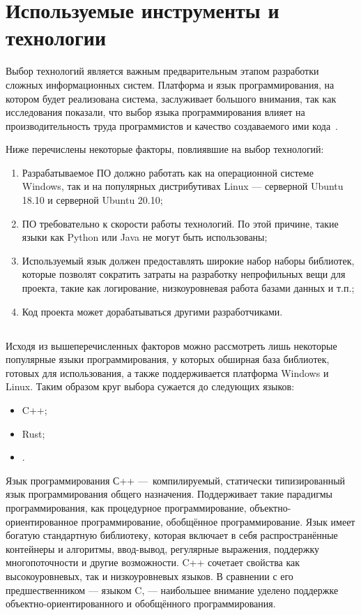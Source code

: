 \section{Используемые инструменты и технологии}\label{sec:tools}

Выбор технологий является важным предварительным этапом разработки сложных информационных систем. Платформа и язык программирования, на котором будет реализована система, заслуживает большого внимания, так как исследования показали, что выбор языка программирования влияет на производительность труда программистов и качество создаваемого ими кода~\cite{code_complete}. %

Ниже перечислены некоторые факторы, повлиявшие на выбор технологий:
\begin{enumerate}
    \item Разрабатываемое ПО должно работать как на операционной системе Windows, так и на популярных дистрибутивах Linux — серверной Ubuntu 18.10 и серверной Ubuntu 20.10;
    \item ПО требовательно к скорости работы технологий. По этой причине, такие языки как Python или Java не могут быть использованы;
    \item Используемый язык должен предоставлять широкие набор наборы библиотек, которые позволят сократить затраты на разработку непрофильных вещи для проекта, такие как логирование, низкоуровневая работа базами данных и т.п.;
    \item Код проекта может дорабатываться другими разработчиками.
\end{enumerate}

\subsection{\csharp}

Исходя из вышеперечисленных факторов можно рассмотреть лишь некоторые популярные языки программирования, у которых обширная база библиотек, готовых для использования, а также поддерживается платформа Windows и Linux. Таким образом круг выбора сужается до следующих языков:
\begin{itemize}
    \item C++;
    \item Rust;
    \item \csharp.
\end{itemize}

Язык программирования С++ — компилируемый, статически типизированный язык программирования общего назначения. Поддерживает такие парадигмы программирования, как процедурное программирование, объектно-ориентированное программирование, обобщённое программирование. Язык имеет богатую стандартную библиотеку, которая включает в себя распространённые контейнеры и алгоритмы, ввод-вывод, регулярные выражения, поддержку многопоточности и другие возможности. C++ сочетает свойства как высокоуровневых, так и низкоуровневых языков. В сравнении с его предшественником — языком C, — наибольшее внимание уделено поддержке объектно-ориентированного и обобщённого программирования.

